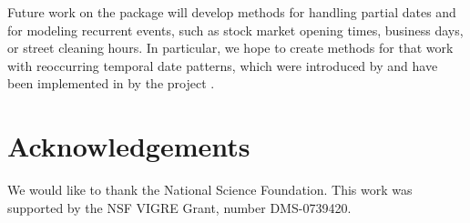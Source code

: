 \documentclass[article]{jss}
\begin{document}
Future work on the  package will develop methods for handling partial dates and for modeling recurrent events, such as stock market opening times, business days, or street cleaning hours. In particular, we hope to create methods for  that work with reoccurring temporal date patterns, which were introduced by \citet{fowler} and have been implemented in  by the  project \citep{runts}.

\section*{Acknowledgements}
We would like to thank the National Science Foundation. This work was supported by the NSF VIGRE Grant, number  DMS-0739420.



\end{document}
